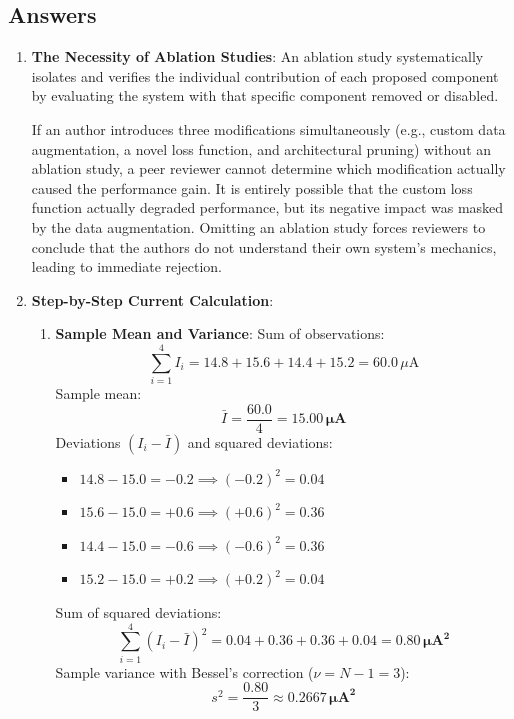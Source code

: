 \subsection*{Answers}

\begin{enumerate}
    \item \textbf{The Necessity of Ablation Studies}:
    An ablation study systematically isolates and verifies the individual contribution of each proposed component by evaluating the system with that specific component removed or disabled. 
    
    If an author introduces three modifications simultaneously (e.g., custom data augmentation, a novel loss function, and architectural pruning) without an ablation study, a peer reviewer cannot determine which modification actually caused the performance gain. It is entirely possible that the custom loss function actually degraded performance, but its negative impact was masked by the data augmentation. Omitting an ablation study forces reviewers to conclude that the authors do not understand their own system's mechanics, leading to immediate rejection.

    \item \textbf{Step-by-Step Current Calculation}:
    \begin{enumerate}
        \item \textbf{Sample Mean and Variance}:
        Sum of observations:
        \begin{equation*}
        \sum_{i=1}^{4} I_i = 14.8 + 15.6 + 14.4 + 15.2 = 60.0\,\mu\text{A}
        \end{equation*}
        Sample mean:
        \begin{equation*}
        \bar{I} = \frac{60.0}{4} = \mathbf{15.00\,\mu\text{A}}
        \end{equation*}
        Deviations $(I_i - \bar{I})$ and squared deviations:
        \begin{itemize}
            \item $14.8 - 15.0 = -0.2 \implies (-0.2)^2 = 0.04$
            \item $15.6 - 15.0 = +0.6 \implies (+0.6)^2 = 0.36$
            \item $14.4 - 15.0 = -0.6 \implies (-0.6)^2 = 0.36$
            \item $15.2 - 15.0 = +0.2 \implies (+0.2)^2 = 0.04$
        \end{itemize}
        Sum of squared deviations:
        \begin{equation*}
        \sum_{i=1}^{4} (I_i - \bar{I})^2 = 0.04 + 0.36 + 0.36 + 0.04 = \mathbf{0.80\,\mu\text{A}^2}
        \end{equation*}
        Sample variance with Bessel's correction ($\nu = N - 1 = 3$):
        \begin{equation*}
        s^2 = \frac{0.80}{3} \approx \mathbf{0.2667\,\mu\text{A}^2}
        \end{equation*}


\end{enumerate}
\end{enumerate}
